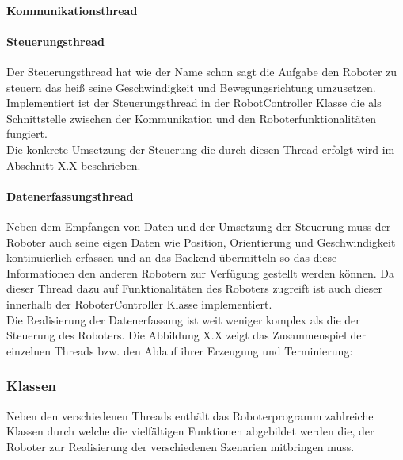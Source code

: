 \paragraph{Kommunikationsthread}
\paragraph{Steuerungsthread}
Der Steuerungsthread hat wie der Name schon sagt die Aufgabe den Roboter zu steuern das heiß seine Geschwindigkeit und Bewegungsrichtung 
umzusetzen. Implementiert ist der Steuerungsthread in der RobotController Klasse die als Schnittstelle zwischen der Kommunikation und den
Roboterfunktionalitäten fungiert. \\
Die konkrete Umsetzung der Steuerung die durch diesen Thread erfolgt wird im Abschnitt X.X beschrieben.
\paragraph{Datenerfassungsthread}
Neben dem Empfangen von Daten und der Umsetzung der Steuerung muss der Roboter auch seine eigen Daten wie Position, Orientierung und 
Geschwindigkeit kontinuierlich erfassen und an das Backend übermitteln so das diese Informationen den anderen Robotern zur Verfügung
gestellt werden können. Da dieser Thread dazu auf Funktionalitäten des Roboters zugreift ist auch dieser innerhalb der RoboterController
Klasse implementiert.
\\
Die Realisierung der Datenerfassung ist weit weniger komplex als die der Steuerung des Roboters. 
Die Abbildung X.X zeigt das Zusammenspiel der einzelnen Threads bzw. den Ablauf ihrer Erzeugung und Terminierung:
\subsubsection{Klassen}
Neben den verschiedenen Threads enthält das Roboterprogramm zahlreiche Klassen durch welche die vielfältigen Funktionen abgebildet 
werden die, der Roboter zur Realisierung der verschiedenen Szenarien mitbringen muss. 
